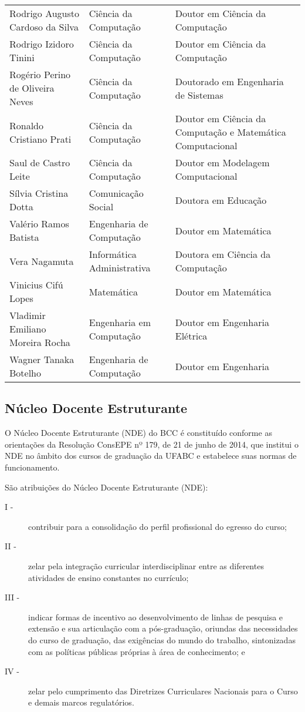{\begin{longtable}{|p{}|p{}|p{}|}
    Rodrigo Augusto Cardoso da Silva & Ciência da Computação & Doutor em Ciência da Computação \\
    Rodrigo Izidoro Tinini & Ciência da Computação & Doutor em Ciência da Computação \\
    Rogério Perino de Oliveira Neves & Ciência da Computação & Doutorado em Engenharia de Sistemas\\
    Ronaldo Cristiano Prati & Ciência da Computação & Doutor em Ciência da Computação e Matemática Computacional \\
    Saul de Castro Leite & Ciência da Computação & Doutor em Modelagem Computacional \\
    Sílvia Cristina Dotta & Comunicação Social & Doutora em Educação \\
    Valério Ramos Batista & Engenharia de Computação & Doutor em Matemática \\
    Vera Nagamuta & Informática Administrativa & Doutora em Ciência da Computação \\
    Vinicius Cifú Lopes & Matemática & Doutor em Matemática \\
    Vladimir Emiliano Moreira Rocha & Engenharia em Computação & Doutor em Engenharia Elétrica \\
    Wagner Tanaka Botelho & Engenharia de Computação & Doutor em Engenharia \\
    \hline
\end{longtable}
}


\subsection{Núcleo Docente Estruturante}

O Núcleo Docente Estruturante (NDE) do BCC é constituído conforme as
orientações da Resolução ConsEPE nº 179, de 21 de junho de 2014, que institui o
NDE no âmbito dos cursos de graduação da UFABC e estabelece suas normas de
funcionamento. 

São atribuições do Núcleo Docente Estruturante (NDE):
\begin{description}
    \item[I -] contribuir para a consolidação do perfil profissional do egresso
    do curso;
    \item[II -] zelar pela integração curricular interdisciplinar entre as
    diferentes atividades de ensino constantes no currículo;
    \item[III -] indicar formas de incentivo ao desenvolvimento de linhas de
    pesquisa e extensão e sua articulação com a pós-graduação, oriundas das
    necessidades do curso de graduação, das exigências do mundo do trabalho,
    sintonizadas com as políticas públicas próprias à área de conhecimento; e
    \item[IV -] zelar pelo cumprimento das Diretrizes Curriculares Nacionais
    para o Curso e demais marcos regulatórios.
\end{description}

